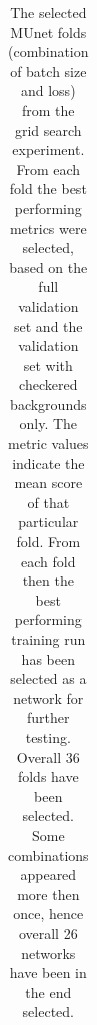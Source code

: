 \begin{table}[H]
\begin{center}
\begin{tabular}{|l|l|l|l|l|l|}
\end{tabular}
\caption{The selected \ac{MUnet} folds (combination of batch size and loss) from the grid search experiment. From each fold the best performing metrics were selected, based on the full validation set and the validation set with checkered backgrounds only. The metric values indicate the mean score of that particular fold. From each fold then the best performing training run has been selected as a network for further testing. Overall 36 folds have been selected. Some combinations appeared more then once, hence overall 26 networks have been in the end selected.}
\label{tab:munet_selected_nets}
\end{center}
\end{table}
